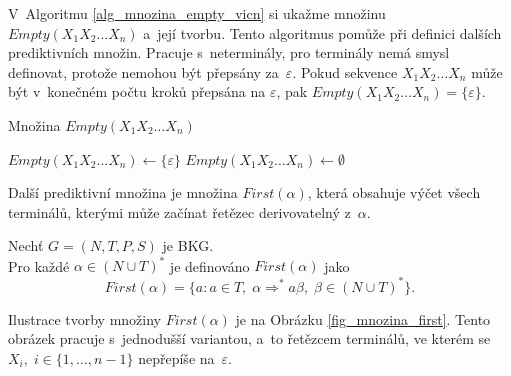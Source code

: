 V~Algoritmu \ref{alg_mnozina_empty_vicn} si ukažme množinu $Empty(X_1X_2\ldots X_n)$ a~její tvorbu.
Tento algoritmus pomůže při definici dalších prediktivních množin.
Pracuje s~neterminály, pro terminály nemá smysl definovat, protože nemohou být přepsány za~$\varepsilon$.
Pokud sekvence $X_1X_2\ldots X_n$ může být v~konečném počtu kroků přepsána na $\varepsilon$, pak $Empty(X_1X_2\ldots X_n) = \{\varepsilon\}$.
\begin{algorithm}[h!]
    \caption{Množina $Empty(X_1X_2\ldots X_n)$}
    \label{alg_mnozina_empty_vicn}
    \begin{algorithmic}[1]
        \NewLine
            \State $Empty(X_1X_2\ldots X_n) \gets \{\varepsilon\}$
        \Else
            \State $Empty(X_1X_2\ldots X_n) \gets \emptyset$
        \EndIf
    \end{algorithmic}
\end{algorithm}

Další prediktivní množina je množina $First(\alpha)$, která obsahuje výčet všech terminálů, kterými může začínat řetězec derivovatelný z~$\alpha$.
\begin{definition}\label{def_mnozina_first}
    Nechť $G = (N, T, P, S)$ je BKG.\\
    Pro každé $\alpha \in (N \cup T)^*$ je definováno $First(\alpha)$ jako
    \begin{equation*}
        First(\alpha) = \{a: a \in T,\; \alpha \Rightarrow^* a\beta,\; \beta \in (N \cup T)^*\}.
    \end{equation*} 
\end{definition}
Ilustrace tvorby množiny $First(\alpha)$ je na Obrázku \ref{fig_mnozina_first}.
Tento obrázek pracuje s~jednodušší variantou, a~to řetězcem terminálů, ve kterém se $X_i,\; i \in \{1, \ldots, n-1\}$ nepřepíše na~$\varepsilon$.

